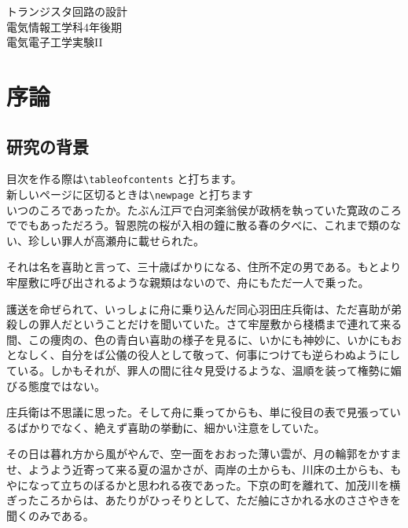 \documentclass[12pt,a4j]{jreport}
\begin{document}
\thispagestyle{empty}
\begin{spacing}{1}
\begin{center}
\vspace*{3.5cm}
{\Huge トランジスタ回路の設計}\\
\vspace*{12.5cm}
{\Large 電気情報工学科4年後期}\\
{\Large 電気電子工学実験II}\\
\vspace*{1cm}
\end{center}


\newpage

\tableofcontents
\end{spacing}
\newpage

\clearpage
{}
\pagestyle{fancy}
\setlength{\headheight}{5truemm}

\chapter{序論}
\section{研究の背景}
目次を作る際は\verb+\tableofcontents+ と打ちます。\\
新しいページに区切るときは\verb+\newpage+ と打ちます\\
いつのころであったか。たぶん江戸で白河楽翁侯が政柄を執っていた寛政のころででもあっただろう。智恩院の桜が入相の鐘に散る春の夕べに、これまで類のない、珍しい罪人が高瀬舟に載せられた。

それは名を喜助と言って、三十歳ばかりになる、住所不定の男である。もとより牢屋敷に呼び出されるような親類はないので、舟にもただ一人で乗った。

護送を命ぜられて、いっしょに舟に乗り込んだ同心羽田庄兵衛は、ただ喜助が弟殺しの罪人だということだけを聞いていた。さて牢屋敷から棧橋まで連れて来る間、この痩肉の、色の青白い喜助の様子を見るに、いかにも神妙に、いかにもおとなしく、自分をば公儀の役人として敬って、何事につけても逆らわぬようにしている。しかもそれが、罪人の間に往々見受けるような、温順を装って権勢に媚びる態度ではない。

庄兵衛は不思議に思った。そして舟に乗ってからも、単に役目の表で見張っているばかりでなく、絶えず喜助の挙動に、細かい注意をしていた。

その日は暮れ方から風がやんで、空一面をおおった薄い雲が、月の輪郭をかすませ、ようよう近寄って来る夏の温かさが、両岸の土からも、川床の土からも、もやになって立ちのぼるかと思われる夜であった。下京の町を離れて、加茂川を横ぎったころからは、あたりがひっそりとして、ただ舳にさかれる水のささやきを聞くのみである。
\end{document}
